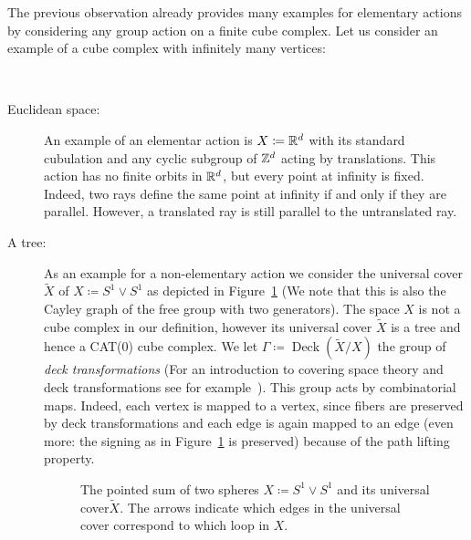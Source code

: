 The previous observation already provides many examples for elementary actions by considering any group action on a finite cube complex. Let us consider an example of a cube complex with infinitely many vertices:

\begin{bsp}~\vspace{-6pt}
  \label{bsp:elementary}
  \begin{description}
  \item[Euclidean space:] An example of an elementar action is \(X \coloneqq \mathbb{R}^d\) with its standard cubulation and any cyclic subgroup of \(\mathbb{Z}^d\) acting by translations. This action has no finite orbits in \(\mathbb{R}^d\), but every point at infinity is fixed. Indeed, two rays define the same point at infinity if and only if they are parallel. However, a translated ray is still parallel to the untranslated ray.
  \item[A tree:]  As an example for a non-elementary action we consider the universal cover \(\tilde X\) of \(X \coloneqq S^1 \vee S^1\) as depicted in Figure~\ref{fig:figure-8} (We note that this is also the Cayley graph of the free group with two generators). The space \(X\) is not a cube complex in our definition, however its universal cover \(\tilde X\) is a tree and hence a CAT(0) cube complex. We let \(\Gamma \coloneqq \operatorname{Deck}(\tilde X/X)\) the group of \emph{deck transformations} (For an introduction to covering space theory and deck transformations see for example~\cite[Section~1.3]{hatcher}). This group acts by combinatorial maps. Indeed, each vertex is mapped to a vertex, since fibers are preserved by deck transformations and each edge is again mapped to an edge (even more: the signing as in Figure~\ref{fig:figure-8} is preserved) because of the path lifting property. 
    \begin{figure}[htbp]
      \centering
      
      \caption{The pointed sum of two spheres \(X \coloneqq S^1 \vee S^1\) and its universal cover\(\tilde X\). The arrows indicate which edges in the universal cover correspond to which loop in \(X\).}
      \label{fig:figure-8}
    \end{figure}


\end{description}
\end{bsp}
